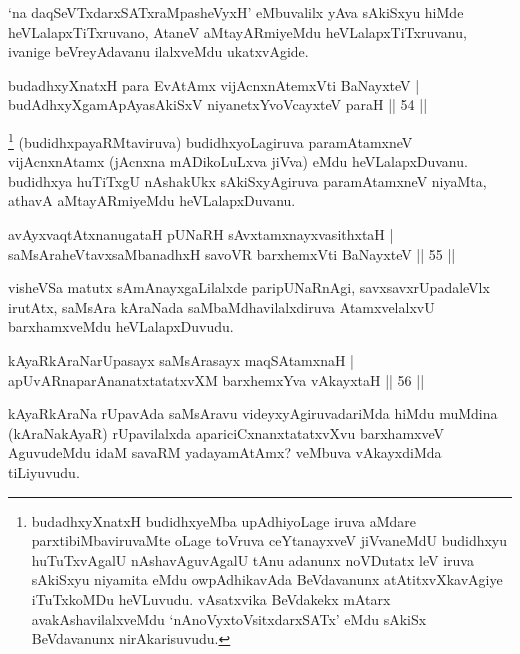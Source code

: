 \begin{artha}
`na daqSeVTxdarxSATxraMpasheVyxH' eMbuvalilx yAva sAkiSxyu hiMde heVLalapxTiTxruvano, AtaneV aMtayARmiyeMdu heVLalapxTiTxruvanu, ivanige beVreyAdavanu ilalxveMdu ukatxvAgide.
\end{artha}


\begin{shl}
budadhxyXnatxH para EvA\s \s tAmx vijAcnxnAtemxVti BaNayxteV |\\
budAdhxyXgamApAyasAkiSxV niyanetxYvoVcayxteV paraH \hfill || 54 ||
\end{shl}

\begin{artha}
\footnote{budadhxyXnatxH budidhxyeMba upAdhiyoLage iruva aMdare parxtibiMbaviruvaMte oLage toVruva ceYtanayxveV jiVvaneMdU budidhxyu huTuTxvAgalU nAshavAguvAgalU tAnu adanunx noVDutatx leV iruva sAkiSxyu niyamita eMdu owpAdhikavAda BeVdavanunx atAtitxvXkavAgiye iTuTxkoMDu heVLuvudu. vAsatxvika BeVdakekx mAtarx avakAshavilalxveMdu `nAnoVyxtoV\s sitxdarxSATx' eMdu sAkiSx BeVdavanunx nirAkarisuvudu.} (budidhxpayaRMtaviruva) budidhxyoLagiruva paramAtamxneV vijAcnxnAtamx (jAcnxna mADikoLuLxva jiVva) eMdu heVLalapxDuvanu. budidhxya huTiTxgU nAshakUkx sAkiSxyAgiruva paramAtamxneV niyaMta, athavA aMtayARmiyeMdu heVLalapxDuvanu.
\end{artha}


\begin{shl}
avAyxvaqtAtxnanugataH pUNaRH sAvxtamxnayxvasithxtaH |\\
saMsAraheVtavxsaMbanadhxH savoVR barxhemxVti BaNayxteV \hfill || 55 ||
\end{shl}

\begin{artha}
visheVSa matutx sAmAnayxgaLilalxde paripUNaRnAgi, savxsavxrUpadaleVlx irutAtx, saMsAra kAraNada saMbaMdhavilalxdiruva AtamxvelalxvU barxhamxveMdu heVLalapxDuvudu.
\end{artha}

\begin{shl}
kAyaRkAraNarUpasayx saMsArasayx maqSAtamxnaH |\\
apUvARnaparAnanatxtatatxvXM barxhemxYva vAkayxtaH \hfill || 56 ||
\end{shl}

\begin{artha}%
kAyaRkAraNa rUpavAda saMsAravu videyxyAgiruvadariMda hiMdu muMdina (kAraNakAyaR) rUpavilalxda apariciCxnanxtatatxvXvu barxhamxveV AguvudeMdu idaM savaRM yadayamAtAmx? veMbuva vAkayxdiMda tiLiyuvudu.
\end{artha}

